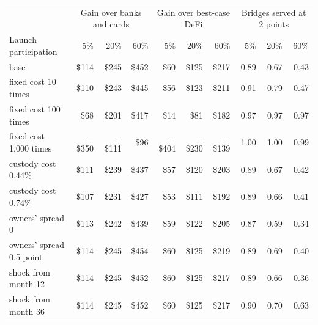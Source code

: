 \begin{tabular}{lrrrrrrrrr}
\toprule
 & \multicolumn{3}{c}{Gain over banks and cards} & \multicolumn{3}{c}{Gain over best-case DeFi} & \multicolumn{3}{c}{Bridges served at 2 points} \\
Launch participation & 5\% & 20\% & 60\% & 5\% & 20\% & 60\% & 5\% & 20\% & 60\% \\
\midrule
base & \$114 & \$245 & \$452 & \$60 & \$125 & \$217 & 0.89 & 0.67 & 0.43 \\
\midrule
fixed cost 10 times & \$110 & \$243 & \$445 & \$56 & \$123 & \$211 & 0.91 & 0.79 & 0.47 \\
fixed cost 100 times & \$68 & \$201 & \$417 & \$14 & \$81 & \$182 & 0.97 & 0.97 & 0.97 \\
fixed cost 1,000 times & $-$\$350 & $-$\$111 & \$96 & $-$\$404 & $-$\$230 & $-$\$139 & 1.00 & 1.00 & 0.99 \\
custody cost 0.44\% & \$111 & \$239 & \$437 & \$57 & \$120 & \$203 & 0.89 & 0.67 & 0.42 \\
custody cost 0.74\% & \$107 & \$231 & \$427 & \$53 & \$111 & \$192 & 0.89 & 0.66 & 0.41 \\
owners' spread 0 & \$113 & \$242 & \$439 & \$59 & \$122 & \$205 & 0.87 & 0.59 & 0.34 \\
owners' spread 0.5 point & \$114 & \$245 & \$454 & \$60 & \$125 & \$219 & 0.89 & 0.69 & 0.40 \\
shock from month 12 & \$114 & \$245 & \$452 & \$60 & \$125 & \$217 & 0.89 & 0.66 & 0.36 \\
shock from month 36 & \$114 & \$245 & \$452 & \$60 & \$125 & \$217 & 0.90 & 0.70 & 0.63 \\
\bottomrule
\end{tabular}
